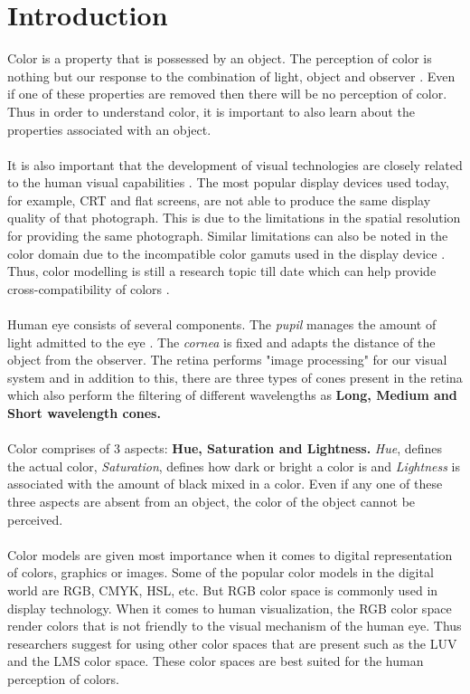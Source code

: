 \documentclass[a4paper, 12pt,oneside]{article}
\begin{document}
\part{Introduction}
Color is a property that is possessed by an object. The perception of color is nothing but our response to the combination of light, object and observer \citep{levkowitz1997color}. Even if one of these properties are removed then there will be no perception of color. Thus in order to understand color, it is important to also learn about the properties associated with an object. 
\\
\\
\noindent It is also important that the development of visual technologies are closely related to the human visual capabilities \citep{levkowitz1997color}. The most popular display devices used today, for example, CRT and flat screens, are not able to produce the same display quality of that photograph. This is due to the limitations in the spatial resolution for providing the same photograph\citep{levkowitz1997color}. Similar limitations can also be noted in the color domain due to the incompatible color gamuts used in the display device \citep{levkowitz1997color}. Thus, color modelling is still a research topic till date which can help provide cross-compatibility of colors \citep{levkowitz1997color}. 
\\
\\
Human eye consists of several components. The \textit{pupil} manages the amount of light admitted to the eye \citep{levkowitz1997color}. The \textit{cornea} is fixed and adapts the distance of the object from the observer. The retina performs "image processing" for our visual system and in addition to this, there are three types of cones present in the retina which also perform the filtering of different wavelengths as \textbf{Long, Medium and Short wavelength cones.} 
\\
\\
Color comprises of 3 aspects: \textbf{Hue, Saturation and Lightness.} \textit{Hue}, defines the actual color, \textit{Saturation}, defines how dark or bright a color is and \textit{Lightness} is associated with the amount of black mixed in a color. Even if any one of these three aspects are absent from an object, the color of the object cannot be perceived. 
\\
\\
Color models are given most importance when it comes to digital representation of colors, graphics or images. Some of the popular color models in the digital world are RGB, CMYK, HSL, etc. But RGB color space is commonly used in display technology. When it comes to human visualization, the RGB color space render colors that is not friendly to the visual mechanism of the human eye. Thus researchers suggest for using other color spaces that are present such as the LUV and the LMS color space. These color spaces are best suited for the human perception of colors.
\end{document}
